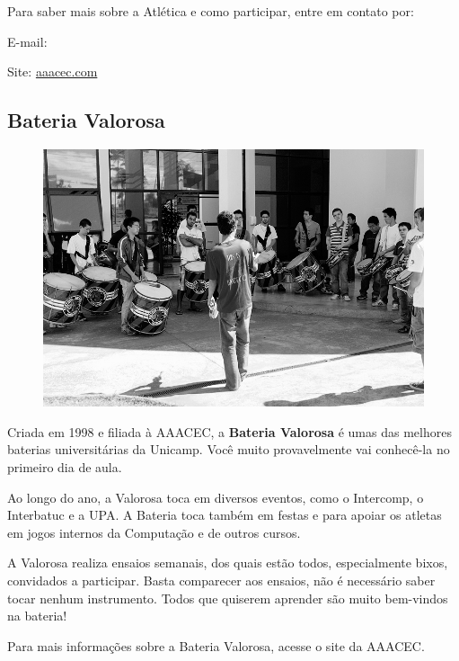 Para saber mais sobre a Atlética e como participar, entre em contato por:

\begin{compactitemize}
\item  E-mail: 
\item  Site: \url{aaacec.com}
\end{compactitemize}

\subsection{Bateria Valorosa}

\begin{figure}[H]
    \centering
    \includegraphics[scale=0.27]{img/valorosa_foto.jpg}
\end{figure}

Criada em 1998 e filiada à AAACEC, a \textbf{Bateria Valorosa} é umas das
melhores baterias universitárias da Unicamp. Você muito provavelmente vai
conhecê-la no primeiro dia de aula.

Ao longo do ano, a Valorosa toca em diversos eventos, como o Intercomp,
o Interbatuc e a UPA. A Bateria toca também em festas e para apoiar os atletas
em jogos internos da Computação e de outros cursos.

A Valorosa realiza ensaios semanais, dos quais estão todos, especialmente bixos,
convidados a participar. Basta comparecer aos ensaios, não é necessário saber
tocar nenhum instrumento. Todos que quiserem aprender são muito bem-vindos na
bateria!

Para mais informações sobre a Bateria Valorosa, acesse o site da AAACEC.

